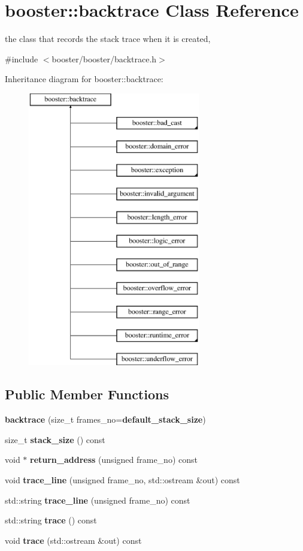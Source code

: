 \section{booster\-:\-:backtrace \-Class \-Reference}
\label{classbooster_1_1backtrace}


the class that records the stack trace when it is created,  




{\ttfamily \#include $<$booster/booster/backtrace.\-h$>$}

\-Inheritance diagram for booster\-:\-:backtrace\-:\begin{figure}[H]
\begin{center}
\leavevmode
\includegraphics[height=12.000000cm]{classbooster_1_1backtrace}
\end{center}
\end{figure}
\subsection*{\-Public \-Member \-Functions}
\begin{DoxyCompactItemize}
\item 
{\bf backtrace} (size\-\_\-t frames\-\_\-no={\bf default\-\_\-stack\-\_\-size})
\item 
size\-\_\-t {\bf stack\-\_\-size} () const 
\item 
void $\ast$ {\bf return\-\_\-address} (unsigned frame\-\_\-no) const 
\item 
void {\bf trace\-\_\-line} (unsigned frame\-\_\-no, std\-::ostream \&out) const 
\item 
std\-::string {\bf trace\-\_\-line} (unsigned frame\-\_\-no) const 
\item 
std\-::string {\bf trace} () const 
\item 
void {\bf trace} (std\-::ostream \&out) const 
\end{DoxyCompactItemize}
